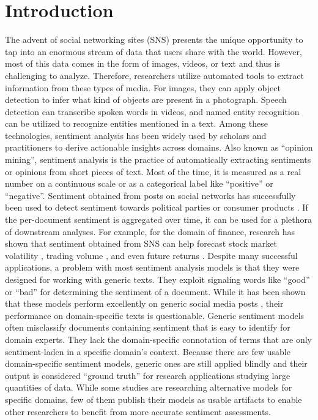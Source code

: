 \section{Introduction}

The advent of social networking sites (SNS) presents the unique opportunity to tap into an enormous stream of data that users share with the world. However, most of this data comes in the form of images, videos, or text and thus is challenging to analyze. Therefore, researchers utilize automated tools to extract information from these types of media. For images, they can apply object detection to infer what kind of objects are present in a photograph. Speech detection can transcribe spoken words in videos, and named entity recognition can be utilized to recognize entities mentioned in a text. Among these technologies, sentiment analysis has been widely used by scholars and practitioners to derive actionable insights across domains. Also known as ``opinion mining'', sentiment analysis is the practice of automatically extracting sentiments or opinions from short pieces of text. Most of the time, it is measured as a real number on a continuous scale or as a categorical label like ``positive'' or ``negative''. Sentiment obtained from posts on social networks has successfully been used to detect sentiment towards political parties  or consumer products \cite{pontiki2016semeval}. If the per-document sentiment is aggregated over time, it can be used for a plethora of downstream analyses. For example, for the domain of finance, research has shown that sentiment obtained from SNS can help forecast stock market volatility , trading volume , and even future returns .\newline
Despite many successful applications, a problem with most sentiment analysis models is that they were designed for working with generic texts. They exploit signaling words like ``good'' or ``bad'' for determining the sentiment of a document. While it has been shown that these models perform excellently on generic social media posts \cite{al2020evaluating}, their performance on domain-specific texts is questionable. Generic sentiment models often misclassify documents containing sentiment that is easy to identify for domain experts. They lack the domain-specific connotation of terms that are only sentiment-laden in a specific domain's context. Because there are few usable domain-specific sentiment models, generic ones are still applied blindly and their output is considered ``ground truth'' for research applications studying large quantities of data. While some studies are researching alternative models for specific domains, few of them publish their models as usable artifacts to enable other researchers to benefit from more accurate sentiment assessments.

